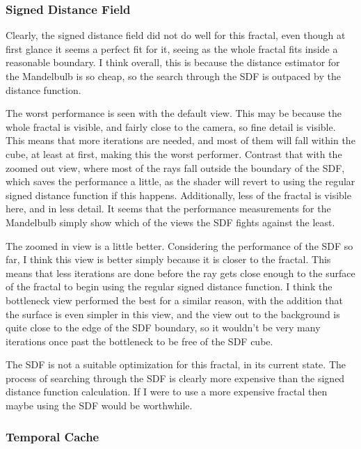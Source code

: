 \subsubsection{Signed Distance Field}

Clearly, the signed distance field did not do well for this fractal, even though at first glance it seems a perfect fit for it, seeing as the whole fractal fits inside a reasonable boundary. I think overall, this is because the distance estimator for the Mandelbulb is so cheap, so the search through the SDF is outpaced by the distance function.\newline

The worst performance is seen with the default view. This may be because the whole fractal is visible, and fairly close to the camera, so fine detail is visible. This means that more iterations are needed, and most of them will fall within the cube, at least at first, making this the worst performer. Contrast that with the zoomed out view, where most of the rays fall outside the boundary of the SDF, which saves the performance a little, as the shader will revert to using the regular signed distance function if this happens. Additionally, less of the fractal is visible here, and in less detail. It seems that the performance measurements for the Mandelbulb simply show which of the views the SDF fights against the least.\newline

The zoomed in view is a little better. Considering the performance of the SDF so far, I think this view is better simply because it is closer to the fractal. This means that less iterations are done before the ray gets close enough to the surface of the fractal to begin using the regular signed distance function. I think the bottleneck view performed the best for a similar reason, with the addition that the surface is even simpler in this view, and the view out to the background is quite close to the edge of the SDF boundary, so it wouldn't be very many iterations once past the bottleneck to be free of the SDF cube.\newline

The SDF is not a suitable optimization for this fractal, in its current state. The process of searching through the SDF is clearly more expensive than the signed distance function calculation. If I were to use a more expensive fractal then maybe using the SDF would be worthwhile.

\subsubsection{Temporal Cache}


